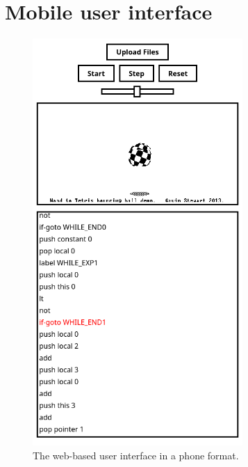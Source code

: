 \section{Mobile user interface}
\begin{center}
  \begin{figure}[ht]
    \centering
    \includegraphics[width=8cm]{fig/ui-demo-mobile.png}
    \caption{The web-based user interface in a phone format.}%
    \label{fig:ui-demo-mobile}
  \end{figure}
\end{center}





